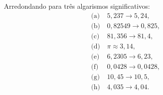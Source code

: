 Arredondando para três algarismos significativos:
\begin{align*}
\text{(a)}
&\ 5{,}237 \to 5{,}24,\\
\text{(b)}
&\ 0{,}82549 \to 0{,}825,\\
\text{(c)}
&\ 81{,}356 \to 81{,}4,\\
\text{(d)}
&\ \pi \approx 3{,}14,\\
\text{(e)}
&\ 6{,}2305 \to 6{,}23,\\
\text{(f)}
&\ 0{,}0428 \to 0{,}0428,\\
\text{(g)}
&\ 10{,}45 \to 10{,}5,\\
\text{(h)}
&\ 4{,}035 \to 4{,}04.
\end{align*}